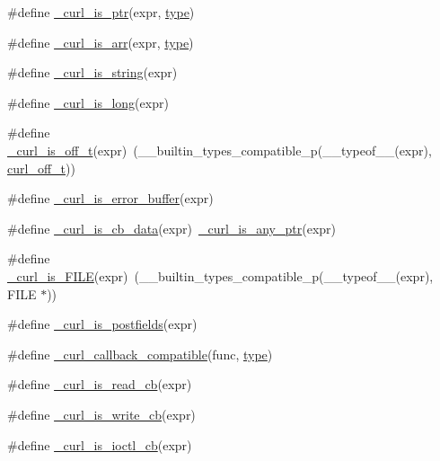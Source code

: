 \begin{DoxyCompactItemize}
\#define \hyperlink{typecheck-gcc_8h_ad2e1376a037840f66b1bb1a2e71824b1}{\+\_\+curl\+\_\+is\+\_\+ptr}(expr,  \hyperlink{x509_8h_ab512b8f495325c7ea0f5a5a5d3f938eb}{type})
\item 
\#define \hyperlink{typecheck-gcc_8h_ab4b17ac3e1c0eccb2c7b7fd63fb07cb6}{\+\_\+curl\+\_\+is\+\_\+arr}(expr,  \hyperlink{x509_8h_ab512b8f495325c7ea0f5a5a5d3f938eb}{type})
\item 
\#define \hyperlink{typecheck-gcc_8h_a3b694a190dcf41d01e8e9cf3bcc85814}{\+\_\+curl\+\_\+is\+\_\+string}(expr)
\item 
\#define \hyperlink{typecheck-gcc_8h_abaaa49a9e8e8c55a4826b6e8c75785cd}{\+\_\+curl\+\_\+is\+\_\+long}(expr)
\item 
\#define \hyperlink{typecheck-gcc_8h_ad6728b9c1e253b78cad52c4a941b477d}{\+\_\+curl\+\_\+is\+\_\+off\+\_\+t}(expr)~(\+\_\+\+\_\+builtin\+\_\+types\+\_\+compatible\+\_\+p(\+\_\+\+\_\+typeof\+\_\+\+\_\+(expr), \hyperlink{curlbuild_8h_a494e2b4279dc064f7ed1d0abd602b28d}{curl\+\_\+off\+\_\+t}))
\item 
\#define \hyperlink{typecheck-gcc_8h_a7dea2a6ee1ed9843193c06b2fa932574}{\+\_\+curl\+\_\+is\+\_\+error\+\_\+buffer}(expr)
\item 
\#define \hyperlink{typecheck-gcc_8h_aabe122a7856e894514e8544629131449}{\+\_\+curl\+\_\+is\+\_\+cb\+\_\+data}(expr)~\hyperlink{typecheck-gcc_8h_a6262734b3ea5822848f25ead84674736}{\+\_\+curl\+\_\+is\+\_\+any\+\_\+ptr}(expr)
\item 
\#define \hyperlink{typecheck-gcc_8h_ab32e4635a06f3260ce2441fd3e8e4784}{\+\_\+curl\+\_\+is\+\_\+\+F\+I\+LE}(expr)~(\+\_\+\+\_\+builtin\+\_\+types\+\_\+compatible\+\_\+p(\+\_\+\+\_\+typeof\+\_\+\+\_\+(expr), F\+I\+LE $\ast$))
\item 
\#define \hyperlink{typecheck-gcc_8h_a1cd86a449c277f08900ac3e930cffe3d}{\+\_\+curl\+\_\+is\+\_\+postfields}(expr)
\item 
\#define \hyperlink{typecheck-gcc_8h_ab17970011d84bb174c2ad1e11361da88}{\+\_\+curl\+\_\+callback\+\_\+compatible}(func,  \hyperlink{x509_8h_ab512b8f495325c7ea0f5a5a5d3f938eb}{type})
\item 
\#define \hyperlink{typecheck-gcc_8h_a1d691b48d922594f30b3c66b3d71fc20}{\+\_\+curl\+\_\+is\+\_\+read\+\_\+cb}(expr)
\item 
\#define \hyperlink{typecheck-gcc_8h_ae471e53d5731bbf0e62d1157ba163e2d}{\+\_\+curl\+\_\+is\+\_\+write\+\_\+cb}(expr)
\item 
\#define \hyperlink{typecheck-gcc_8h_a343634078b6083aacab216927bd5bfd3}{\+\_\+curl\+\_\+is\+\_\+ioctl\+\_\+cb}(expr)

\end{DoxyCompactItemize}
